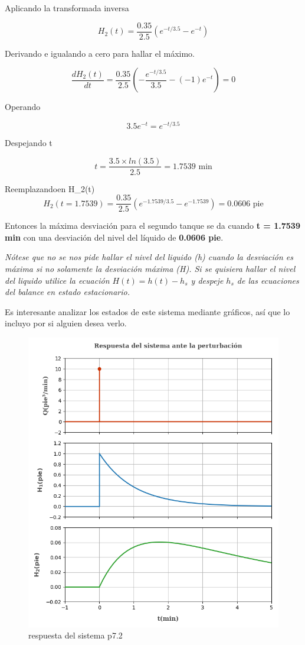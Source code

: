 \documentclass[
  letterpaper,
  DIV=11,
  numbers=noendperiod]{scrreprt}
\begin{document}
Aplicando la transformada inversa

\[
H_2(t)=\frac{0.35}{2.5}\left(e^{-t/3.5}-e^{-t}\right)
\]

Derivando e igualando a cero para hallar el máximo.

\[
\frac{dH_2(t)}{dt}=\frac{0.35}{2.5}\left(-\frac{e^{-t/3.5}}{3.5}-(-1)e^{-t}\right)=0
\]

Operando

\[
3.5e^{-t}=e^{-t/3.5}
\]

Despejando t

\[
t=\frac{3.5\times ln(3.5)}{2.5} = 1.7539\text{ min}
\]

Reemplazandoen H\_2(t) \[
H_2(t=1.7539)=\frac{0.35}{2.5}\left(e^{-1.7539/3.5}-e^{-1.7539}\right) = 0.0606\text{ pie}
\]

Entonces la máxima desviación para el segundo tanque se da cuando
\textbf{t = 1.7539 min} con una desviación del nivel del líquido de
\textbf{0.0606 pie}.

\emph{Nótese que no se nos pide hallar el nivel del liquido (h) cuando
la desviación es máxima si no solamente la desviación máxima (H). Si se
quisiera hallar el nivel del liquido utilice la ecuación
\emph{\(H(t) = h(t)-h_s\)} y despeje \(h_s\) de las ecuaciones del
balance en estado estacionario.}

Es interesante analizar los estados de este sistema mediante gráficos,
así que lo incluyo por si alguien desea verlo.

\begin{figure}

{\centering \includegraphics{././images/p7.2-coughanowr/p72r.png}

}

\caption{respuesta del sistema p7.2}

\end{figure}
\end{document}
